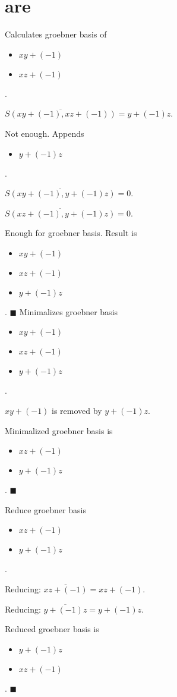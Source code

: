 \documentclass{jsarticle}
\begin{document}
\section{are}Calculates groebner basis of
\begin{itemize}
\item $xy+(-1)$
\item $xz+(-1)$
\end{itemize}  .


$\overline{S(xy+(-1), xz+(-1))} = y+(-1)z$.

Not enough.  Appends \begin{itemize}
\item $y+(-1)z$
\end{itemize}  .


$\overline{S(xy+(-1), y+(-1)z)} = 0$.

$\overline{S(xz+(-1), y+(-1)z)} = 0$.

Enough for groebner basis.  Result is \begin{itemize}
\item $xy+(-1)$
\item $xz+(-1)$
\item $y+(-1)z$
\end{itemize}  .
$\blacksquare{}$
Minimalizes groebner basis
\begin{itemize}
\item $xy+(-1)$
\item $xz+(-1)$
\item $y+(-1)z$
\end{itemize}  .


$xy+(-1)$ is removed by $y+(-1)z$.

Minimalized groebner basis is 
\begin{itemize}
\item $xz+(-1)$
\item $y+(-1)z$
\end{itemize}  .
$\blacksquare{}$

Reduce groebner basis
\begin{itemize}
\item $xz+(-1)$
\item $y+(-1)z$
\end{itemize}  .


Reducing: $\overline{xz+(-1)} = xz+(-1)$.

Reducing: $\overline{y+(-1)z} = y+(-1)z$.

Reduced groebner basis is
\begin{itemize}
\item $y+(-1)z$
\item $xz+(-1)$
\end{itemize}  .
$\blacksquare{}$
\end{document}
